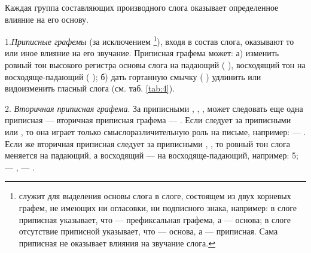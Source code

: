 Каждая группа составляющих производного слога оказывает определенное влияние на его основу.

1.\emph{Приписные графемы} (за исключением \footnote[11]{ служит для выделения основы слога в слоге, состоящем из двух корневых графем, не имеющих ни огласовки, ни подписного знака, например: в слоге  приписная  указывает, что  --- префиксальная графема, а  --- основа; в слоге  отсутствие приписной  указывает, что  --- основа, а  --- приписная. Сама приписная не оказывает влияния на звучание слога.}), входя в состав слога, оказывают то или иное влияние на его звучание. Приписная графема может: а) изменить ровный тон высокого регистра основы слога на падающий
(  \toneN ), восходящий тон на восходяще-падающий (  \toneVN ); б) дать гортанную смычку ( \toneG ) удлинить или видоизменить гласный слога (см. таб. \ref{tab:4}).

2. \emph{Вторичная приписная графема}. За приписными , , ,  может следовать еще одна приписная --- вторичная приписная графема --- . Если  следует за приписными  или , то она играет только смыслоразличительную роль на письме, например:  --- . Если же вторичная приписная следует за приписными , , то ровный тон слога меняется на падающий, а восходящий --- на восходяще-падающий, например:  5;  ---  , --- .

